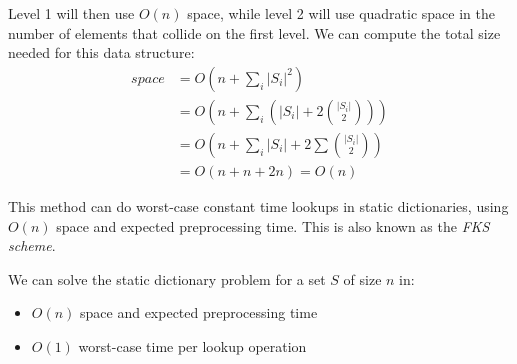                 Level 1 will then use $O(n)$ space, while level 2 will use quadratic space in the number of elements that collide on the first level.
                We can compute the total size needed for this data structure:
                \begin{align*}
                    space
                    &= O\left( n + \sum_i |S_i|^2 \right) \\
                    &= O\left( n + \sum_i \left( |S_i| + 2 \binom{|S_i|}{2}\right)\right) \\
                    &= O\left( n + \sum_i |S_i| + 2 \sum \binom{|S_i|}{2}\right) \\
                    &= O\left( n + n + 2n \right) = O(n)
                \end{align*}

                This method can do worst-case constant time lookups in static dictionaries, using $O(n)$ space and expected preprocessing time.
                This is also known as the \emph{FKS scheme}.

                \begin{theorem}
                    We can solve the static dictionary problem for a set $S$ of size $n$ in:
                    \begin{itemize}
                        \item $O(n)$ space and expected preprocessing time
                        \item $O(1)$ worst-case time per lookup operation
                    \end{itemize}
                \end{theorem}
